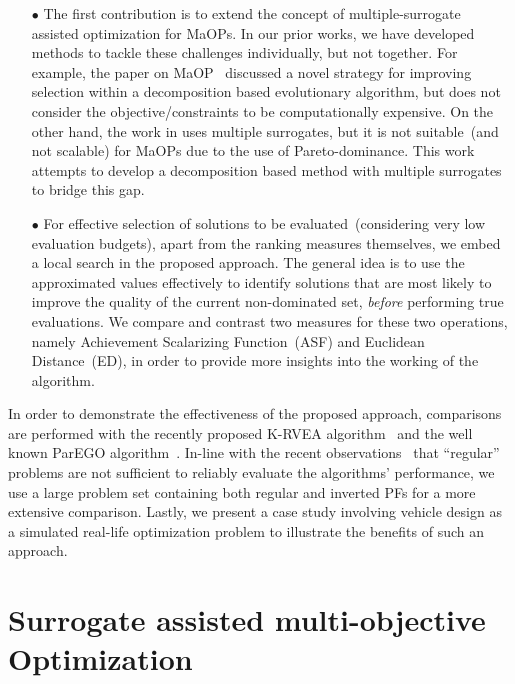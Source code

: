 \documentclass[twocolumn,10pt]{asme2ej}
\begin{document}
\begin{itemize}

\item[$\bullet$] The first contribution is to extend the concept of multiple-surrogate assisted optimization for MaOPs. In our prior works, we have developed methods to tackle these challenges individually, but not together. For example, the paper on MaOP~\cite{KHTjmd2017} discussed a novel strategy for improving selection within a decomposition based evolutionary algorithm, but does not consider the objective/constraints to be computationally expensive. On the other hand, the work in \cite{KHTjmd2016,bhattacharjee2016multiple} uses multiple surrogates, but it is not suitable~(and not scalable) for MaOPs due to the use of Pareto-dominance. This work attempts to develop a decomposition based method with multiple surrogates to bridge this gap. 

\item[$\bullet$]  For effective selection of solutions to be evaluated~(considering very low evaluation budgets), apart from the ranking measures themselves, we embed a local search in the proposed approach. The general idea is to use the approximated values effectively to identify solutions that are most likely to improve the quality of the current non-dominated set, \emph{before} performing true evaluations. We compare and contrast two measures for these two operations, namely Achievement Scalarizing Function~(ASF) and Euclidean Distance~(ED), in order to provide more insights into the working of the algorithm. 


\end{itemize}


In order to demonstrate the effectiveness of the proposed approach, comparisons are performed with the recently proposed K-RVEA algorithm~\cite{KHTchugh2016krvea,KHTchugh2016const} and the well known ParEGO algorithm~\cite{KHTknowles2006pha}. In-line with the recent observations~\cite{asaf2017enhanced,KHTishibuchi2016inverse} that ``regular'' problems are not sufficient to reliably evaluate the algorithms' performance, we use a large problem set containing both regular and inverted PFs for a more extensive comparison. Lastly, we present a case study involving vehicle design as a simulated real-life optimization problem to illustrate the benefits of such an approach. 



\section{Surrogate assisted multi-objective Optimization}
\label{sec:KHTsec:3}
\end{document}
